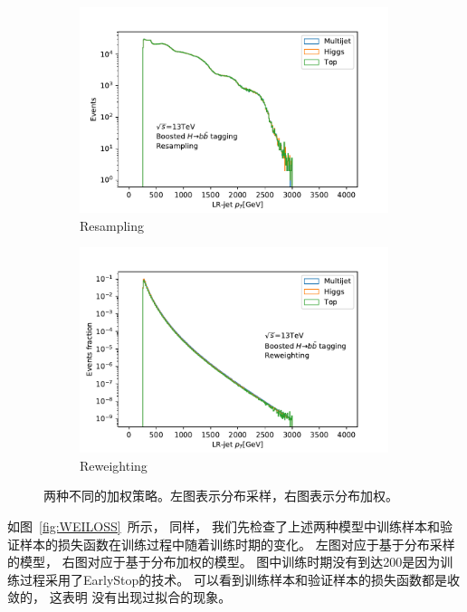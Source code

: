 \begin{figure}[htbp]
  \begin{subfigure}{.5\textwidth}
  \centering
   \includegraphics[width=0.99\textwidth]{figuresXbb/resample.pdf}
   \caption{Resampling}
   \label{fig:resample}
  \end{subfigure}
  \begin{subfigure}{.5\textwidth}
  \centering
   \includegraphics[width=0.99\textwidth]{figuresXbb/reweight.pdf}
   \caption{Reweighting}
   \label{fig:reweight}
  \end{subfigure}
  \caption{
  两种不同的加权策略。左图表示分布采样，右图表示分布加权。
  }
  \label{fig:ReweightPt}
\end{figure} 

如图~\ref{fig:WEILOSS}~所示，
同样，
我们先检查了上述两种模型中训练样本和验证样本的损失函数在训练过程中随着训练时期的变化。
左图对应于基于分布采样的模型，
右图对应于基于分布加权的模型。
图中训练时期没有到达200是因为训练过程采用了EarlyStop的技术。
可以看到训练样本和验证样本的损失函数都是收敛的，
这表明
没有出现过拟合的现象。

